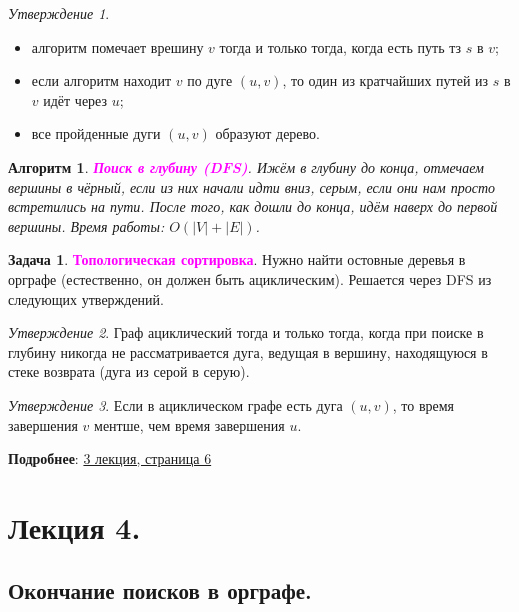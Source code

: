 \documentclass[a4paper]{article}
\theoremstyle{indented}
\newtheorem{alg}{Алгоритм}
\theoremstyle{definition}
\newtheorem{prob}{Задача}
\theoremstyle{remark}
\newtheorem{stat}{Утверждение}
\begin{document}
\begin{stat} \ 
    \begin{itemize}
        \item алгоритм помечает врешину $v$ тогда и только тогда, когда есть путь тз $s$ в $v$; 
        \item если алгоритм находит $v$ по дуге $(u, v)$, то один из кратчайших путей из $s$ в $v$ идёт через $u$; 
        \item все пройденные дуги $(u, v)$ образуют дерево.
    \end{itemize}
\end{stat}

\begin{alg}
    \textcolor{magenta}{\hypertarget{t11}{\textbf{Поиск в глубину (DFS)}}}. Ижём в глубину до конца, отмечаем вершины в чёрный, если из них начали идти вниз, серым, если они нам просто встретились на пути. После того, как дошли до конца, идём наверх до первой вершины. Время работы: $O(|V|+|E|)$. 
\end{alg}

\begin{prob}
    \textcolor{magenta}{\hypertarget{t12}{\textbf{Топологическая сортировка}}}. Нужно найти остовные деревья в орграфе (естественно, он должен быть ациклическим). Решается через DFS из следующих утверждений. 
\end{prob}

\begin{stat}
    Граф ациклический тогда и только тогда, когда при поиске в глубину никогда не рассматривается дуга, ведущая в вершину, находящуюся в стеке возврата (дуга из серой в серую).
\end{stat}

\begin{stat}
    Если в ациклическом графе есть дуга $(u, v)$, то время завершения $v$ ментше, чем время завершения $u$. 
\end{stat}

\textbf{Подробнее}: \href{https://users.math-cs.spbu.ru/~okhotin/teaching/algorithms_2020/okhotin_algorithms_2020_l3.pdf}{3 лекция, страница 6}

\section{Лекция 4.}

\subsection{Окончание поисков в орграфе.}
\end{document}
